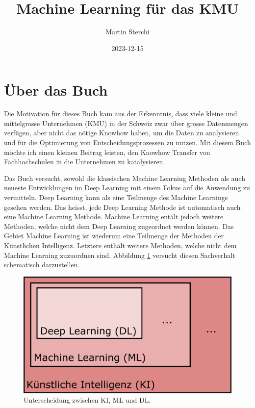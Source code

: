\documentclass[
]{book}
\title{Machine Learning für das KMU}
\author{Martin Sterchi}
\date{2023-12-15}
\begin{document}
\maketitle

{
\setcounter{tocdepth}{1}
\tableofcontents
}
\hypertarget{uxfcber-das-buch}{%
\chapter*{Über das Buch}\label{uxfcber-das-buch}}

Die Motivation für dieses Buch kam aus der Erkenntnis, dass viele kleine und mittelgrosse Unternehmen (KMU) in der Schweiz zwar über grosse Datenmengen verfügen, aber nicht das nötige Knowhow haben, um die Daten zu analysieren und für die Optimierung von Entscheidungsprozessen zu nutzen. Mit diesem Buch möchte ich einen kleinen Beitrag leisten, den Knowhow Transfer von Fachhochschulen in die Unternehmen zu katalysieren.

Das Buch versucht, sowohl die klassischen Machine Learning Methoden als auch neueste Entwicklungen im Deep Learning mit einem Fokus auf die Anwendung zu vermitteln. Deep Learning kann als eine Teilmenge des Machine Learnings gesehen werden. Das heisst, jede Deep Learning Methode ist automatisch auch eine Machine Learning Methode. Machine Learning entält jedoch weitere Methoden, welche nicht dem Deep Learning zugeordnet werden können. Das Gebiet Machine Learning ist wiederum eine Teilmenge der Methoden der Künstlichen Intelligenz. Letztere enthält weitere Methoden, welche nicht dem Machine Learning zuzuordnen sind. Abbildung \ref{fig:kimldl} versucht diesen Sachverhalt schematisch darzustellen.

\begin{figure}

{\centering \includegraphics[width=0.6\linewidth]{images/KI_ML_DL} 

}

\caption{Unterscheidung zwischen KI, ML und DL. }\label{fig:kimldl}
\end{figure}
\end{document}
